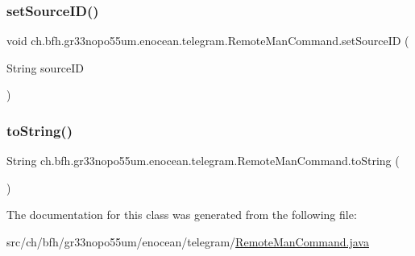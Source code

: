 \hypertarget{classch_1_1bfh_1_1gr33nopo55um_1_1enocean_1_1telegram_1_1_remote_man_command_a5c7238fc8509de7415fe9b38cfd43e17}{}\label{classch_1_1bfh_1_1gr33nopo55um_1_1enocean_1_1telegram_1_1_remote_man_command_a5c7238fc8509de7415fe9b38cfd43e17} 
\subsubsection{\texorpdfstring{set\+Source\+I\+D()}{setSourceID()}}
{\footnotesize\ttfamily void ch.\+bfh.\+gr33nopo55um.\+enocean.\+telegram.\+Remote\+Man\+Command.\+set\+Source\+ID (\begin{DoxyParamCaption}\item[{String}]{source\+ID }\end{DoxyParamCaption})}

\hypertarget{classch_1_1bfh_1_1gr33nopo55um_1_1enocean_1_1telegram_1_1_remote_man_command_a2679db1bbc80a2f014121612e97e8fde}{}\label{classch_1_1bfh_1_1gr33nopo55um_1_1enocean_1_1telegram_1_1_remote_man_command_a2679db1bbc80a2f014121612e97e8fde} 
\subsubsection{\texorpdfstring{to\+String()}{toString()}}
{\footnotesize\ttfamily String ch.\+bfh.\+gr33nopo55um.\+enocean.\+telegram.\+Remote\+Man\+Command.\+to\+String (\begin{DoxyParamCaption}{ }\end{DoxyParamCaption})}



The documentation for this class was generated from the following file\+:\begin{DoxyCompactItemize}
\item 
src/ch/bfh/gr33nopo55um/enocean/telegram/\hyperlink{ch_2bfh_2gr33nopo55um_2enocean_2telegram_2_remote_man_command_8java}{Remote\+Man\+Command.\+java}\end{DoxyCompactItemize}

